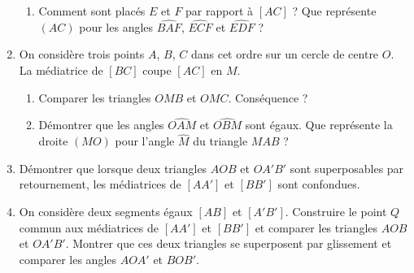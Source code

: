 \begin{enumerate}
\begin{enumerate}
\item Comment sont placés $E$ et $F$ par rapport à $[AC]$ ? Que représente $(AC)$ 
pour les angles $\widehat{BAF}$, $\widehat{ECF}$ et $\widehat{EDF}$ ? 
\end{enumerate}
\item On considère trois points $A$, $B$, $C$ dans cet ordre sur un cercle de centre $O$. La médiatrice de $[BC]$ coupe $[AC]$ en $M$. \begin{enumerate}
\item Comparer les triangles $OMB$ et $OMC$. Conséquence ? 
\item Démontrer que les angles $\widehat{OAM}$ et $\widehat{OBM}$ sont égaux. 
Que représente la droite $(MO)$ pour l'angle $\widehat{M}$ du triangle $MAB$ ?
\end{enumerate}
\item Démontrer que lorsque deux triangles $AOB$ et $OA'B'$ sont superposables par 
retournement, les médiatrices de $[AA']$ et $[BB']$ sont confondues. 
\item On considère deux segments égaux $[AB]$ et $[A'B']$. Construire le point $Q$ commun aux médiatrices de $[AA']$ et $[BB']$ et comparer les triangles $AOB$ et $OA'B'$. Montrer que ces deux triangles se superposent par glissement et comparer les angles $AOA'$ et $BOB'$. 
\end{enumerate}